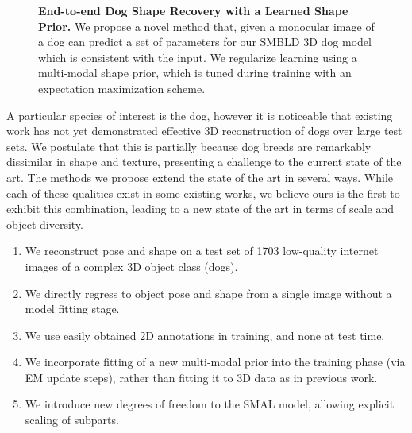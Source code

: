 \begin{figure}[t]
\medbreak
\caption{
\textbf{End-to-end Dog Shape Recovery with a Learned Shape Prior.}
We propose a novel method that, given a monocular image of a dog can predict a set of parameters for our SMBLD 3D dog model which is consistent with the input. We regularize learning using a multi-modal shape prior, which is tuned during training with an expectation maximization scheme.\label{fig:splash}}
\end{figure}

A particular species of interest is the dog, however it is noticeable that existing work has not yet demonstrated effective 3D reconstruction of dogs over large test sets.
We postulate that this is partially because dog breeds are remarkably dissimilar in shape and texture, presenting a challenge to the current state of the art.
The methods we propose extend the state of the art in several ways.
While each of these qualities exist in some existing works, we believe ours is the first to exhibit this combination, leading to a new state of the art in terms of scale and object diversity.
\begin{enumerate}
    \item We reconstruct pose and shape on a test set of 1703 low-quality internet images of a complex 3D object class (dogs).
    \item We directly regress to object pose and shape from a single image without a model fitting stage.
    \item We use easily obtained 2D annotations in training, and none at test time.
    \item We incorporate fitting of a new multi-modal prior into the training phase (via EM update steps), rather than fitting it to 3D data as in previous work.
    \item We introduce new degrees of freedom to the SMAL model, 
    allowing explicit scaling of subparts.
\end{enumerate}

